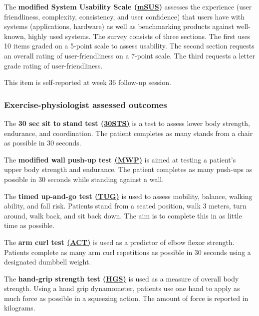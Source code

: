 \documentclass[11pt,parskip=half-]{scrartcl}
\begin{document}
\label{outcome:msus}
The \textbf{modified System Usability Scale (\hyperref[analysis:msus]{mSUS})} assesses the experience (user friendliness, complexity, consistency, and user confidence) that users have with systems (applications, hardware) as well as benchmarking products against well-known, highly used systems. The survey consists of three sections. The first uses 10 items graded on a 5-point scale to assess usability. The second section requests an overall rating of user-friendliness on a 7-point scale. The third requests a letter grade rating of user-friendliness.

This item is self-reported at week 36 follow-up session.

\subsubsection{Exercise-physiologist assessed outcomes}\label{epa-outcomes}

\label{outcome:30sts}
The \textbf{30 sec sit to stand test \hyperref[analysis:strength]{(30STS)}} \cites{rikli1999development}{jones199930}{macfarlane2006validity} is a test to assess lower body strength, endurance, and coordination. The patient completes as many stands from a chair as possible in 30 seconds.

\label{outcome:mwp}
The \textbf{modified wall push-up test \hyperref[analysis:strength]{(MWP)}} is aimed at testing a patient’s upper body strength and endurance. The patient completes as many push-ups as possible in 30 seconds while standing against a wall.

\label{outcome:tug}
The \textbf{timed up-and-go test \hyperref[analysis:strength]{(TUG)}} \cites{podsiadlo1991timed}{shumway2000predicting} is used to assess mobility, balance, walking ability, and fall risk. Patients stand from a seated position, walk 3 meters, turn around, walk back, and sit back down. The aim is to complete this in as little time as possible.

\label{outcome:act}
The \textbf{arm curl test \hyperref[analysis:strength]{(ACT)}} \cites{rikli1999development}{liu2017predicting} is used as a predictor of elbow flexor strength. Patients complete as many arm curl repetitions as possible in 30 seconds using a designated dumbbell weight.

\label{outcome:hgs}
The \textbf{hand-grip strength test \hyperref[analysis:strength]{(HGS)}} \cite{liu2017predicting} is used as a measure of overall body strength. Using a hand grip dynamometer, patients use one hand to apply as much force as possible in a squeezing action. The amount of force is reported in kilograms.
\end{document}
